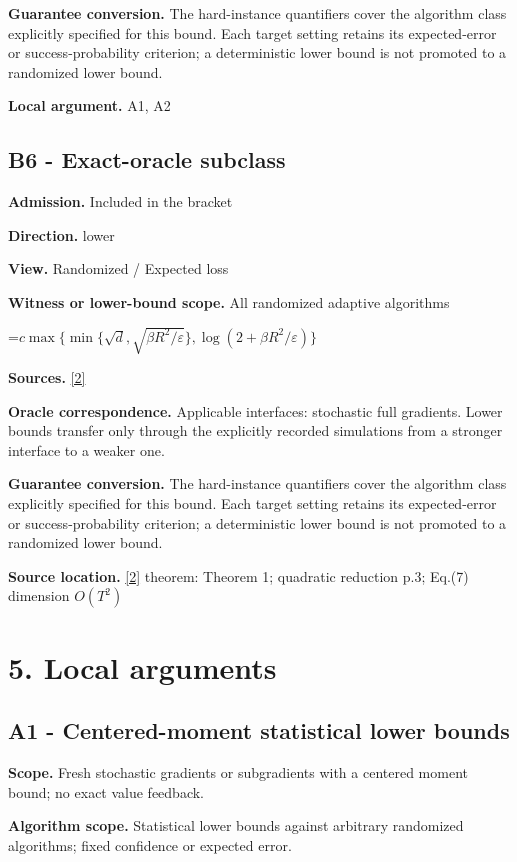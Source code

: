\documentclass[10pt,a4paper]{article}
\newcommand{\AtlasMath}[1]{\par\begingroup\centering\setbox0=\hbox{$\displaystyle #1$}\ifdim\wd0>1.4\linewidth\typeout{ATLAS WIDE FORMULA: \the\wd0}\fi\ifdim\wd0>\linewidth\resizebox{\linewidth}{!}{\box0}\else\box0\fi\par\endgroup}
\begin{document}
\textbf{Guarantee conversion.} The hard-instance quantifiers cover the algorithm class explicitly specified for this bound. Each target setting retains its expected-error or success-probability criterion; a deterministic lower bound is not promoted to a randomized lower bound.

\textbf{Local argument.} A1, A2

\subsection{B6 - Exact-oracle subclass}
\textbf{Admission.} Included in the bracket

\textbf{Direction.} lower

\textbf{View.} Randomized / Expected loss

\textbf{Witness or lower-bound scope.} All randomized adaptive algorithms

\AtlasMath{c\max\{\min\{\sqrt d,\sqrt{\beta R^2/\varepsilon}\},\log(2+\beta R^2/\varepsilon)\}}
\textbf{Sources.} \href{https://arxiv.org/pdf/2609.10874}{[2]}

\textbf{Oracle correspondence.} Applicable interfaces: stochastic full gradients. Lower bounds transfer only through the explicitly recorded simulations from a stronger interface to a weaker one.

\textbf{Guarantee conversion.} The hard-instance quantifiers cover the algorithm class explicitly specified for this bound. Each target setting retains its expected-error or success-probability criterion; a deterministic lower bound is not promoted to a randomized lower bound.

\textbf{Source location.} \href{https://arxiv.org/pdf/2609.10874}{[2]} theorem: Theorem 1; quadratic reduction p.3; Eq.(7) dimension $O(T^2)$

\section{5. Local arguments}
\subsection{A1 - Centered-moment statistical lower bounds}
\textbf{Scope.} Fresh stochastic gradients or subgradients with a centered moment bound; no exact value feedback.

\textbf{Algorithm scope.} Statistical lower bounds against arbitrary randomized algorithms; fixed confidence or expected error.
\end{document}
